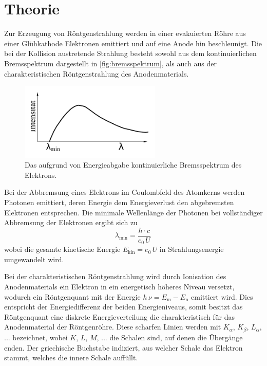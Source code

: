 \section{Theorie}
\label{sec:Theorie}

Zur Erzeugung von Röntgenstrahlung werden in einer evakuierten Röhre aus einer Glühkathode
Elektronen emittiert und auf eine Anode hin beschleunigt.
Die bei der Kollision austretende Strahlung besteht sowohl aus dem kontinuierlichen 
Bremsspektrum dargestellt in \autoref{fig:bremsspektrum}, 
als auch aus der charakteristischen Röntgenstrahlung des Anodenmaterials.
\begin{figure}
    \centering
    \includegraphics[width=0.6\textwidth]{pictures/bremsspektrum.pdf}
    \caption{Das aufgrund von Energieabgabe kontinuierliche Bremsspektrum des Elektrons. \cite{v602}}
    \label{fig:bremsspektrum}
\end{figure}
Bei der Abbremsung eines Elektrons im Coulombfeld des Atomkerns werden Photonen emittiert, 
deren Energie dem Energieverlust den abgebremsten Elektronen entsprechen.
Die minimale Wellenlänge der Photonen bei vollständiger Abbremsung der Elektronen ergibt sich zu
\begin{equation}
    \lambda_\text{min} = \frac{h \cdot c}{e_0 \, U} \,
\end{equation}
wobei die gesamte kinetische Energie $E_\text{kin} = e_0 \, U$ in Strahlungsenergie umgewandelt wird.

Bei der charakteristischen Röntgenstrahlung wird durch Ionisation des Anodenmaterials ein Elektron in ein energetisch höheres Niveau versetzt,
wodurch ein Röntgenquant mit der Energie $h \, \nu = E_\text{m} - E_\text{n}$ emittiert wird. 
Dies entspricht der Energiedifferenz der beiden Energieniveaus, 
somit besitzt das Röntgenquant eine diskrete Energieverteilung die charakteristisch für das Anodenmaterial der Röntgenröhre.
Diese scharfen Linien werden mit $K_\alpha$, $K_\beta$, $L_\alpha$, ... bezeichnet, wobei $K$, $L$, $M$, ... die Schalen sind, auf denen die Übergänge enden.
Der griechische Buchstabe indiziert, aus welcher Schale das Elektron stammt, welches die innere Schale auffüllt. 

